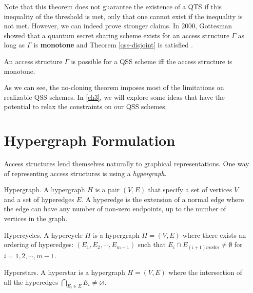 Note that this theorem does not guarantee the existence of a QTS if this inequality of the threshold is met, only that one cannot exist if the inequality is not met. However, we can indeed prove stronger claims. In 2000, Gottesman showed that a quantum secret sharing scheme exists for an access structure $\Gamma$ as long as $\Gamma$ is \textbf{monotone} and Theorem \ref{qss-disjoint} is satisfied \cite{Gottesman_2000}.


\begin{theorem}
    \label{monotone-gamma}
    An access structure $\Gamma$ is possible for a QSS scheme iff the access structure is monotone.
\end{theorem}

As we can see, the no-cloning theorem imposes most of the limitations on realizable QSS schemes. In \cref{ch3}, we will explore some ideas that have the potential to relax the constraints on our QSS schemes. 

 
\section{Hypergraph Formulation}

Access structures lend themselves naturally to graphical representations. One way of representing access structures is using a \textit{hypergraph}.

\theoremstyle{definition}
\begin{definition}{Hypergraph.}
    A hypergraph $H$ is a pair $(V,E)$ that specify a set of vertices $V$ and a set of hyperedges $E$. A hyperedge is the extension of a normal edge where the edge can have any number of non-zero endpoints, up to the number of vertices in the graph.
\end{definition}

\theoremstyle{definition}
\begin{definition}{Hypercycles.}
    A hypercycle $H$ is a hypergraph $H = (V,E)$ where there exists an ordering of hyperedges: $(E_1, E_2, \cdots, E_{m-1})$ such that $E_{i} \cap E_{(i+1) m o d m} \neq \emptyset$ for $i = 1,2,\cdots,m-1$.
\end{definition}

\theoremstyle{definition}
\begin{definition}{Hyperstars.}
    A hyperstar is a hypergraph $H = (V,E)$ where the intersection of all the hyperedges $\bigcap_{E_{i} \in E} E_{i} \neq \varnothing$.
\end{definition}